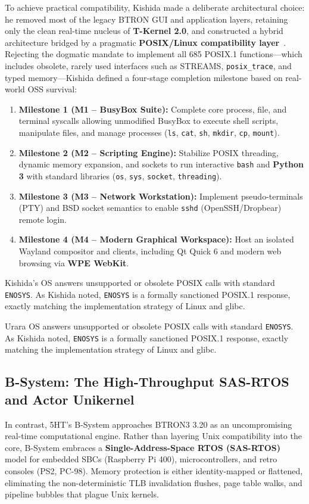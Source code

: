 \documentclass[10pt,journal,compsoc,twocolumn]{article}
\begin{document}
To achieve practical compatibility, Kishida made a deliberate architectural choice: he removed most of the legacy BTRON GUI and application layers, retaining only the clean real-time nucleus of \textbf{T-Kernel 2.0}, and constructed a hybrid architecture bridged by a pragmatic \textbf{POSIX/Linux compatibility layer}~\cite{kishida2026posixstrategy}. Rejecting the dogmatic mandate to implement all 685 POSIX.1 functions—which includes obsolete, rarely used interfaces such as STREAMS, \texttt{posix\_trace}, and typed memory—Kishida defined a four-stage completion milestone based on real-world OSS survival:
\begin{enumerate}[leftmargin=*]
    \item \textbf{Milestone 1 (M1 -- BusyBox Suite):} Complete core process, file, and terminal syscalls allowing unmodified BusyBox to execute shell scripts, manipulate files, and manage processes (\texttt{ls}, \texttt{cat}, \texttt{sh}, \texttt{mkdir}, \texttt{cp}, \texttt{mount}).
    \item \textbf{Milestone 2 (M2 -- Scripting Engine):} Stabilize POSIX threading, dynamic memory expansion, and sockets to run interactive \texttt{bash} and \textbf{Python 3} with standard libraries (\texttt{os}, \texttt{sys}, \texttt{socket}, \texttt{threading}).
    \item \textbf{Milestone 3 (M3 -- Network Workstation):} Implement pseudo-terminals (PTY) and BSD socket semantics to enable \texttt{sshd} (OpenSSH/Dropbear) remote login.
    \item \textbf{Milestone 4 (M4 -- Modern Graphical Workspace):} Host an isolated Wayland compositor and clients, including Qt Quick 6 and modern web browsing via \textbf{WPE WebKit}.
\end{enumerate}

Kishida's OS answers unsupported or obsolete POSIX calls with standard \texttt{ENOSYS}. As Kishida noted, \texttt{ENOSYS} is a formally sanctioned POSIX.1 response, exactly matching the implementation strategy of Linux and glibc.

Urara OS answers unsupported or obsolete POSIX calls with standard \texttt{ENOSYS}. As Kishida noted, \texttt{ENOSYS} is a formally sanctioned POSIX.1 response, exactly matching the implementation strategy of Linux and glibc.

\subsection{B-System: The High-Throughput SAS-RTOS and Actor Unikernel}
In contrast, 5HT's B-System approaches BTRON3 3.20 as an uncompromising real-time computational engine. Rather than layering Unix compatibility into the core, B-System embraces a \textbf{Single-Address-Space RTOS (SAS-RTOS)} model for embedded SBCs (Raspberry Pi 400), microcontrollers, and retro consoles (PS2, PC-98). Memory protection is either identity-mapped or flattened, eliminating the non-deterministic TLB invalidation flushes, page table walks, and pipeline bubbles that plague Unix kernels. 
\end{document}
